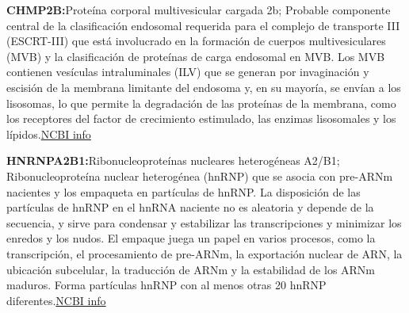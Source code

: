 \hfill

\textbf{CHMP2B:}Proteína corporal multivesicular cargada 2b; Probable componente central de la clasificación endosomal requerida para el complejo de transporte III (ESCRT-III) que está involucrado en la formación de cuerpos multivesiculares (MVB) y la clasificación de proteínas de carga endosomal en MVB. Los MVB contienen vesículas intraluminales (ILV) que se generan por invaginación y escisión de la membrana limitante del endosoma y, en su mayoría, se envían a los lisosomas, lo que permite la degradación de las proteínas de la membrana, como los receptores del factor de crecimiento estimulado, las enzimas lisosomales y los lípidos.\href{https://www.ncbi.nlm.nih.gov/nuccore/NM_001244644.1}{NCBI info}

\hfill

\textbf{HNRNPA2B1:}Ribonucleoproteínas nucleares heterogéneas A2/B1; Ribonucleoproteína nuclear heterogénea (hnRNP) que se asocia con pre-ARNm nacientes y los empaqueta en partículas de hnRNP. La disposición de las partículas de hnRNP en el hnRNA naciente no es aleatoria y depende de la secuencia, y sirve para condensar y estabilizar las transcripciones y minimizar los enredos y los nudos. El empaque juega un papel en varios procesos, como la transcripción, el procesamiento de pre-ARNm, la exportación nuclear de ARN, la ubicación subcelular, la traducción de ARNm y la estabilidad de los ARNm maduros. Forma partículas hnRNP con al menos otras 20 hnRNP diferentes.\href{https://www.ncbi.nlm.nih.gov/nuccore/NM_002137.3}{NCBI info}